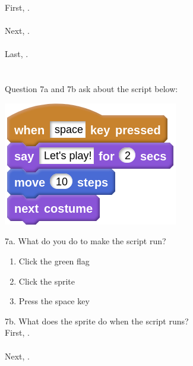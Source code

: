 \documentclass[letterpaper,12pt]{article}
\begin{document}
\noindent First, \hrulefill . \\ \\
Next, \hrulefill . \\ \\
Last, \hrulefill . \\ \\


\noindent \dotfill \\
Question 7a and 7b ask about the script below:
\begin{center}
\includegraphics[scale=.4]{q7_script0.png}
\end{center}

\noindent 7a. What do you do to make the script run?
\renewcommand{\theenumi}{\Alph{enumi}}
\begin{enumerate}
\item Click the green flag
\item Click the sprite
\item Press the space key \\
\end{enumerate}

\noindent 7b. What does the sprite do when the script runs? \\

\noindent First, \hrulefill . \\ \\
Next, \hrulefill . \\ \\
\end{document}
